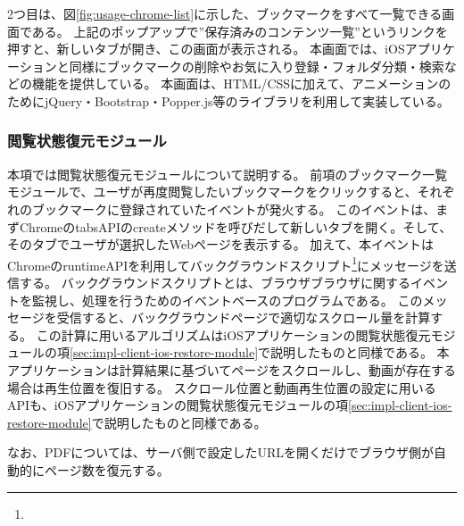 2つ目は、図\ref{fig:usage-chrome-list}に示した、ブックマークをすべて一覧できる画面である。
上記のポップアップで”保存済みのコンテンツ一覧”というリンクを押すと、新しいタブが開き、この画面が表示される。
本画面では、iOSアプリケーションと同様にブックマークの削除やお気に入り登録・フォルダ分類・検索などの機能を提供している。
本画面は、HTML/CSSに加えて、アニメーションのためにjQuery\cite{jquery}・Bootstrap\cite{bootstrap}・Popper.js\cite{popper}等のライブラリを利用して実装している。

\subsubsection{閲覧状態復元モジュール}
本項では閲覧状態復元モジュールについて説明する。
前項のブックマーク一覧モジュールで、ユーザが再度閲覧したいブックマークをクリックすると、それぞれのブックマークに登録されていたイベントが発火する。
このイベントは、まずChromeのtabsAPIのcreateメソッドを呼びだして新しいタブを開く。そして、そのタブでユーザが選択したWebページを表示する。
加えて、本イベントはChromeのruntimeAPI\cite{chrome-runtime-api}を利用してバックグラウンドスクリプト\footnote{}にメッセージを送信する。
バックグラウンドスクリプトとは、ブラウザブラウザに関するイベントを監視し、処理を行うためのイベントベースのプログラムである。
このメッセージを受信すると、バックグラウンドページで適切なスクロール量を計算する。
この計算に用いるアルゴリズムはiOSアプリケーションの閲覧状態復元モジュールの項\ref{sec:impl-client-ios-restore-module}で説明したものと同様である。
本アプリケーションは計算結果に基づいてページをスクロールし、動画が存在する場合は再生位置を復旧する。
スクロール位置と動画再生位置の設定に用いるAPIも、iOSアプリケーションの閲覧状態復元モジュールの項\ref{sec:impl-client-ios-restore-module}で説明したものと同様である。

なお、PDFについては、サーバ側で設定したURLを開くだけでブラウザ側が自動的にページ数を復元する。

